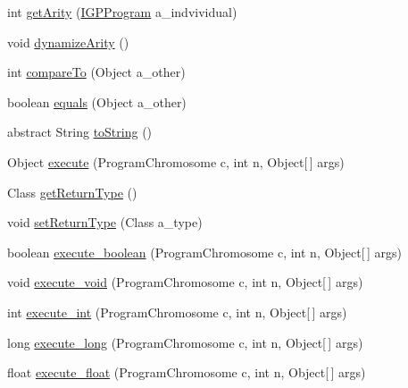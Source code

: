 \begin{DoxyCompactItemize}
\item 
int \hyperlink{classorg_1_1jgap_1_1gp_1_1_command_gene_a2f2fd7c05e6e948e2fd1a7bd0df37ef1}{get\-Arity} (\hyperlink{interfaceorg_1_1jgap_1_1gp_1_1_i_g_p_program}{I\-G\-P\-Program} a\-\_\-indvividual)
\item 
void \hyperlink{classorg_1_1jgap_1_1gp_1_1_command_gene_aabe0b0ca8475649ed49a75a4aba5f6d7}{dynamize\-Arity} ()
\item 
int \hyperlink{classorg_1_1jgap_1_1gp_1_1_command_gene_a7d5b399cad245a0276bd0b62c9e5a4a8}{compare\-To} (Object a\-\_\-other)
\item 
boolean \hyperlink{classorg_1_1jgap_1_1gp_1_1_command_gene_abe7b7d820daf4157937f16688f5d7a8d}{equals} (Object a\-\_\-other)
\item 
abstract String \hyperlink{classorg_1_1jgap_1_1gp_1_1_command_gene_a236141d99059da808afe7a9217e411c7}{to\-String} ()
\item 
Object \hyperlink{classorg_1_1jgap_1_1gp_1_1_command_gene_ad52394b663eee83923a49edc55c1b638}{execute} (Program\-Chromosome c, int n, Object\mbox{[}$\,$\mbox{]} args)
\item 
Class \hyperlink{classorg_1_1jgap_1_1gp_1_1_command_gene_a2b466f1bd4416ce97c0d2567be1f65a8}{get\-Return\-Type} ()
\item 
void \hyperlink{classorg_1_1jgap_1_1gp_1_1_command_gene_ab67c5d8d2c3ced1f0a0b6b4c5753a38a}{set\-Return\-Type} (Class a\-\_\-type)
\item 
boolean \hyperlink{classorg_1_1jgap_1_1gp_1_1_command_gene_af35f8b1f9627260aa16e9689cb43c8ec}{execute\-\_\-boolean} (Program\-Chromosome c, int n, Object\mbox{[}$\,$\mbox{]} args)
\item 
void \hyperlink{classorg_1_1jgap_1_1gp_1_1_command_gene_aa9c066b919322a628e3191d18aa051ac}{execute\-\_\-void} (Program\-Chromosome c, int n, Object\mbox{[}$\,$\mbox{]} args)
\item 
int \hyperlink{classorg_1_1jgap_1_1gp_1_1_command_gene_a573adc8c273f5b31440eb3a9f5b5bf92}{execute\-\_\-int} (Program\-Chromosome c, int n, Object\mbox{[}$\,$\mbox{]} args)
\item 
long \hyperlink{classorg_1_1jgap_1_1gp_1_1_command_gene_a1e749ee8c4254a0b9fe05304b4059835}{execute\-\_\-long} (Program\-Chromosome c, int n, Object\mbox{[}$\,$\mbox{]} args)
\item 
float \hyperlink{classorg_1_1jgap_1_1gp_1_1_command_gene_a3121d3fa3968828546b94ea413d030a4}{execute\-\_\-float} (Program\-Chromosome c, int n, Object\mbox{[}$\,$\mbox{]} args)
\item 

\end{DoxyCompactItemize}
